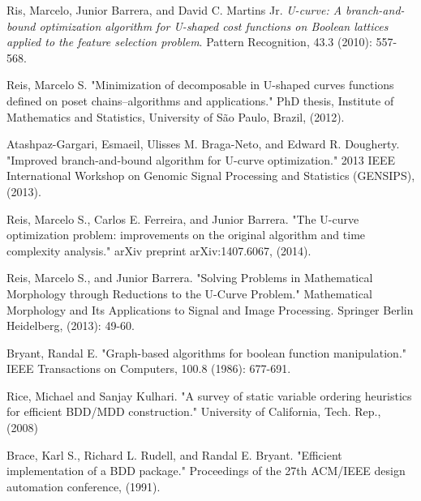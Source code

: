 \documentclass[12pt]{article}
\begin{document}
\begin{thebibliography}{9}


Ris, Marcelo, Junior Barrera, and David C. Martins Jr. \emph{U-curve: A branch-and-bound optimization algorithm for U-shaped cost functions on Boolean lattices applied to the feature selection problem}. Pattern Recognition, 43.3 (2010): 557-568.

Reis, Marcelo S. "Minimization of decomposable in U-shaped curves functions defined on poset chains–algorithms and applications." PhD thesis, Institute of Mathematics and Statistics, University of São Paulo, Brazil, (2012).

Atashpaz-Gargari, Esmaeil, Ulisses M. Braga-Neto, and Edward R. Dougherty. "Improved branch-and-bound algorithm for U-curve optimization." 2013 IEEE International Workshop on Genomic Signal Processing and Statistics (GENSIPS), (2013).

Reis, Marcelo S., Carlos E. Ferreira, and Junior Barrera. "The U-curve optimization problem: improvements on the original algorithm and time complexity analysis." arXiv preprint arXiv:1407.6067, (2014). 

Reis, Marcelo S., and Junior Barrera. "Solving Problems in Mathematical Morphology through Reductions to the U-Curve Problem." Mathematical Morphology and Its Applications to Signal and Image Processing. Springer Berlin Heidelberg, (2013): 49-60.

Bryant, Randal E. "Graph-based algorithms for boolean function manipulation." IEEE Transactions on Computers, 100.8 (1986): 677-691. 

Rice, Michael and Sanjay Kulhari. "A survey of static variable ordering heuristics for efficient BDD/MDD construction." University of California, Tech. Rep., (2008)

Brace, Karl S., Richard L. Rudell, and Randal E. Bryant. "Efficient implementation of a BDD package." Proceedings of the 27th ACM/IEEE design automation conference, (1991). 


\end{thebibliography}
\end{document}
